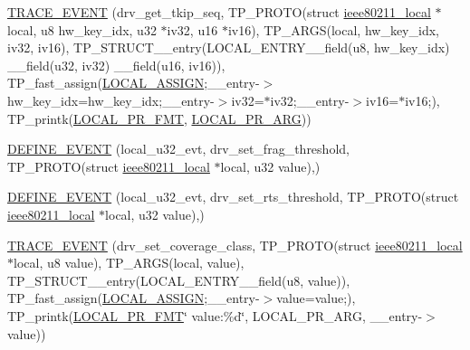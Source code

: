 \begin{DoxyCompactItemize}
\hyperlink{driver-trace_8h_ac48913afdbea944199169c365490011c}{T\-R\-A\-C\-E\-\_\-\-E\-V\-E\-N\-T} (drv\-\_\-get\-\_\-tkip\-\_\-seq, T\-P\-\_\-\-P\-R\-O\-T\-O(struct \hyperlink{structieee80211__local}{ieee80211\-\_\-local} $\ast$local, u8 hw\-\_\-key\-\_\-idx, u32 $\ast$iv32, u16 $\ast$iv16), T\-P\-\_\-\-A\-R\-G\-S(local, hw\-\_\-key\-\_\-idx, iv32, iv16), T\-P\-\_\-\-S\-T\-R\-U\-C\-T\-\_\-\-\_\-entry(L\-O\-C\-A\-L\-\_\-\-E\-N\-T\-R\-Y\-\_\-\-\_\-field(u8, hw\-\_\-key\-\_\-idx) \-\_\-\-\_\-field(u32, iv32) \-\_\-\-\_\-field(u16, iv16)), T\-P\-\_\-fast\-\_\-assign(\hyperlink{driver-trace_8h_ab19d9141887ea92ef9640df06a51e0a1}{L\-O\-C\-A\-L\-\_\-\-A\-S\-S\-I\-G\-N};\-\_\-\-\_\-entry-\/$>$hw\-\_\-key\-\_\-idx=hw\-\_\-key\-\_\-idx;\-\_\-\-\_\-entry-\/$>$iv32=$\ast$iv32;\-\_\-\-\_\-entry-\/$>$iv16=$\ast$iv16;), T\-P\-\_\-printk(\hyperlink{driver-trace_8h_a09833af423135e21ffe99a59ae088cf1}{L\-O\-C\-A\-L\-\_\-\-P\-R\-\_\-\-F\-M\-T}, \hyperlink{driver-trace_8h_aa2a77a17621ecb4f0b3926fec90a5538}{L\-O\-C\-A\-L\-\_\-\-P\-R\-\_\-\-A\-R\-G}))
\item 
\hyperlink{driver-trace_8h_a70af3456dd0193a333983989235daf9a}{D\-E\-F\-I\-N\-E\-\_\-\-E\-V\-E\-N\-T} (local\-\_\-u32\-\_\-evt, drv\-\_\-set\-\_\-frag\-\_\-threshold, T\-P\-\_\-\-P\-R\-O\-T\-O(struct \hyperlink{structieee80211__local}{ieee80211\-\_\-local} $\ast$local, u32 value),)
\item 
\hyperlink{driver-trace_8h_a66f2bf5b77669870b1037094be04d8b5}{D\-E\-F\-I\-N\-E\-\_\-\-E\-V\-E\-N\-T} (local\-\_\-u32\-\_\-evt, drv\-\_\-set\-\_\-rts\-\_\-threshold, T\-P\-\_\-\-P\-R\-O\-T\-O(struct \hyperlink{structieee80211__local}{ieee80211\-\_\-local} $\ast$local, u32 value),)
\item 
\hyperlink{driver-trace_8h_a318d2673b310d387380a894450631834}{T\-R\-A\-C\-E\-\_\-\-E\-V\-E\-N\-T} (drv\-\_\-set\-\_\-coverage\-\_\-class, T\-P\-\_\-\-P\-R\-O\-T\-O(struct \hyperlink{structieee80211__local}{ieee80211\-\_\-local} $\ast$local, u8 value), T\-P\-\_\-\-A\-R\-G\-S(local, value), T\-P\-\_\-\-S\-T\-R\-U\-C\-T\-\_\-\-\_\-entry(L\-O\-C\-A\-L\-\_\-\-E\-N\-T\-R\-Y\-\_\-\-\_\-field(u8, value)), T\-P\-\_\-fast\-\_\-assign(\hyperlink{driver-trace_8h_ab19d9141887ea92ef9640df06a51e0a1}{L\-O\-C\-A\-L\-\_\-\-A\-S\-S\-I\-G\-N};\-\_\-\-\_\-entry-\/$>$value=value;), T\-P\-\_\-printk(\hyperlink{driver-trace_8h_a09833af423135e21ffe99a59ae088cf1}{L\-O\-C\-A\-L\-\_\-\-P\-R\-\_\-\-F\-M\-T}\char`\"{} value\-:\%d\char`\"{}, L\-O\-C\-A\-L\-\_\-\-P\-R\-\_\-\-A\-R\-G, \-\_\-\-\_\-entry-\/$>$value))
\item 

\end{DoxyCompactItemize}

